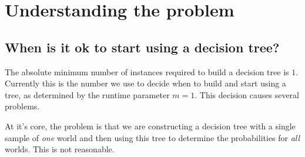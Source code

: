 \documentclass[a4paper]{article}
\newcommand{\dt}{{decision tree}\xspace}
\begin{document}
\section{Understanding the problem}
\label{sec:understanding}

\subsection{When is it ok to start using a \dt?}
\label{subsec:useDT}

The absolute minimum number of instances required to build a \dt is $1$. Currently this is the number we use to decide when to build and start using a tree, as determined by the  runtime parameter $m=1$. This decision causes several problems. 

At it's core, the problem is that we are constructing a \dt with a single sample of \emph{one} world and then using this tree to determine the probabilities for \emph{all} worlds. This is not reasonable. 
\end{document}
